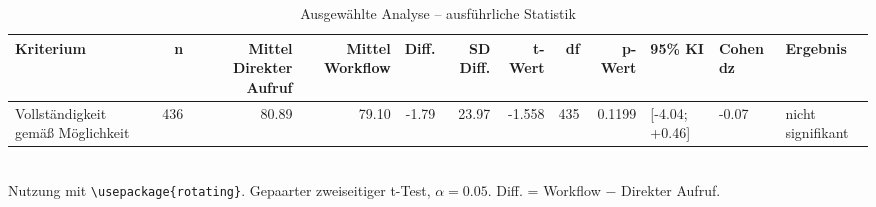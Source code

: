 \begin{table}
\centering
\caption{Ausgewählte Analyse -- ausführliche Statistik}
\begin{tabular}{lrrrrrrrrlll}
\toprule
Kriterium & n & Mittel Direkter Aufruf & Mittel Workflow & Diff. & SD Diff. & t-Wert & df & p-Wert & 95\% KI & Cohen dz & Ergebnis \\
\midrule
Vollständigkeit gemäß Möglichkeit & 436 & 80.89 & 79.10 & -1.79 & 23.97 & -1.558 & 435 & 0.1199 & [-4.04; +0.46] & -0.07 & nicht signifikant \\
\bottomrule
\end{tabular}
\\[2mm]
\footnotesize Nutzung mit \texttt{\textbackslash usepackage\{rotating\}}. Gepaarter zweiseitiger t-Test, $\alpha=0.05$. Diff. = Workflow $-$ Direkter Aufruf.
\end{table}
